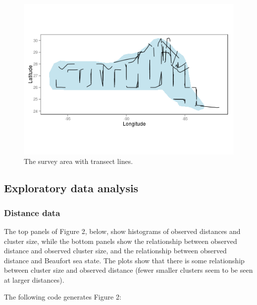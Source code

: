 \documentclass[]{article}
\begin{document}
\begin{figure}[htbp]
\centering
\includegraphics{mexico-figs/areawithtransects.png}
\caption{The survey area with transect lines.}
\end{figure}

\subsection{Exploratory data analysis}\label{exploratory-data-analysis}

\subsubsection{Distance data}\label{distance-data}

The top panels of Figure 2, below, show histograms of observed distances
and cluster size, while the bottom panels show the relationship between
observed distance and observed cluster size, and the relationship
between observed distance and Beaufort sea state. The plots show that
there is some relationship between cluster size and observed distance
(fewer smaller clusters seem to be seen at larger distances).

The following code generates Figure 2:
\end{document}
